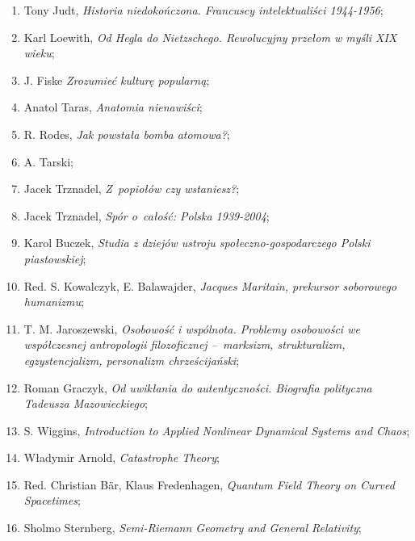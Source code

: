 \documentclass[a4paper,11pt]{article}
\begin{document}
\begin{enumerate}
\item Tony Judt, \textit{Historia niedokończona. Francuscy
    intelektualiści 1944-1956};

\item Karl Loewith, \textit{Od Hegla do Nietzschego. Rewolucyjny przełom
    w myśli XIX wieku};

\item J. Fiske \textit{Zrozumieć kulturę popularną};

\item Anatol Taras, \textit{Anatomia nienawiści};

\item R. Rodes, \textit{Jak powstała bomba atomowa?};

\item A. Tarski;

\item Jacek Trznadel, \textit{Z~popiołów czy wstaniesz?};

\item Jacek Trznadel, \textit{Spór o~całość: Polska 1939-2004};

\item Karol Buczek, \textit{Studia z dziejów ustroju
    społeczno-gospodarczego Polski piastowskiej};

\item Red. S. Kowalczyk, E. Balawajder, \textit{Jacques Maritain,
    prekursor soborowego humanizmu};

\item T. M. Jaroszewski, \textit{Osobowość i wspólnota. Problemy
    osobowości we współczesnej antropologii filozoficznej --~marksizm,
    strukturalizm, egzystencjalizm, personalizm chrześcijański};

\item Roman Graczyk, \textit{Od uwikłania do autentyczności. Biografia
    polityczna Tadeusza Mazowieckiego};

\item S. Wiggins, \textit{Introduction to Applied Nonlinear Dynamical
    Systems and Chaos};

\item Władymir Arnold, \textit{Catastrophe Theory};

\item Red. Christian B\"{a}r, Klaus Fredenhagen, \textit{Quantum Field
    Theory on Curved Spacetimes};

\item Sholmo Sternberg, \textit{Semi-Riemann Geometry and General
    Relativity};


\end{enumerate}
\end{document}
